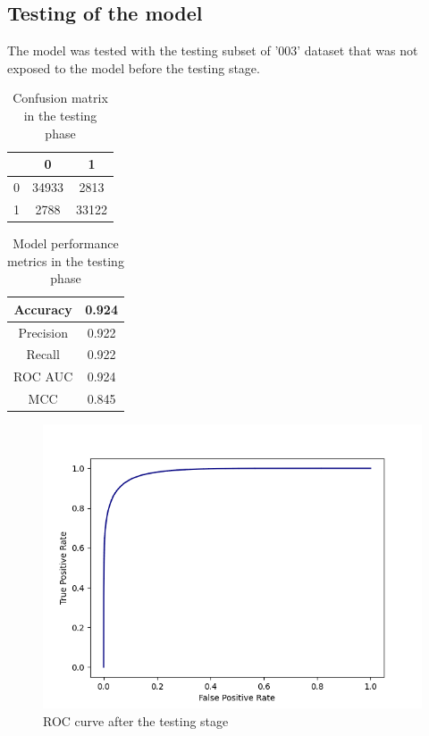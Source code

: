\documentclass[12pt]{report}
\begin{document}
	\newpage

	\subsection{Testing of the model}

	The model was tested with the testing subset of '003' dataset that was
	not exposed to the model before the testing stage. 

	\begin{table}[h!]
		\caption{Confusion matrix in the testing phase}
		\vspace{0.2cm}
		\centering
		\begin{tabular}{ | c | c | c | }
			\hline 
			& 0 & 1 \\
			\hline  
			0 & 34933 & 2813 \\
			\hline 
			1 & 2788 & 33122 \\
			\hline    
		\end{tabular}
		\label{table:SLP003confusionMatrixTesting}
	\end{table}

	\begin{table}[h!]
		\caption{Model performance metrics in the testing phase}
		\vspace{0.2cm}
		\centering
		\begin{tabular}{ | c | c | }
			\hline 
			Accuracy & 0.924 \\
			\hline  
			Precision & 0.922 \\
			\hline 
			Recall & 0.922 \\
			\hline    
			ROC AUC & 0.924 \\
			\hline 
			MCC & 0.845 \\
			\hline 
		\end{tabular}
		\label{table:SLP003metricsTesting}
	\end{table}

	\begin{figure}[h!]
		\centering
		\includegraphics[scale=0.7]{testing_0_3068.png}

		\caption{ ROC curve after the testing stage}
		\label{figure:SLP003testing}
	\end{figure}
\end{document}
